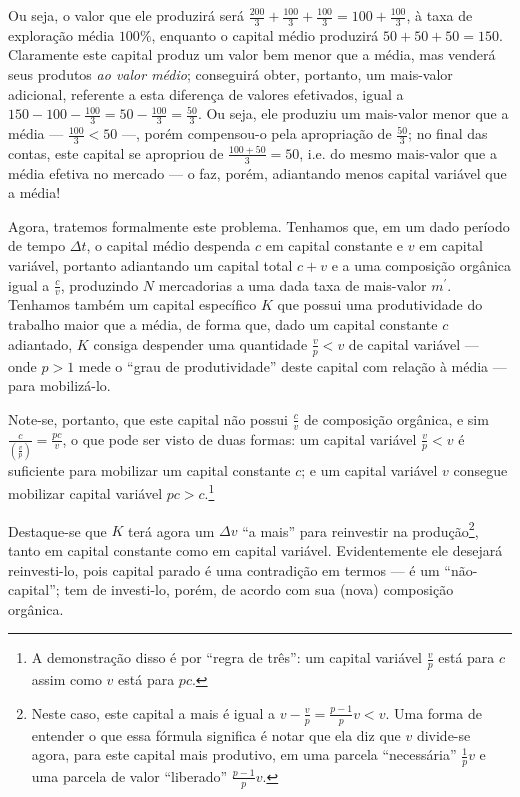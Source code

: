 Ou seja, o valor que ele produzirá será $\frac{200}{3} + \frac{100}{3} + \frac{100}{3}=100+\frac{100}{3}$, à taxa de exploração média $100\%$, enquanto o capital médio produzirá $50+50+50=150$. Claramente este capital produz um valor bem menor que a média, mas venderá seus produtos \textit{ao valor médio}; conseguirá obter, portanto, um mais-valor adicional, referente a esta diferença de valores efetivados, igual a $150-100 - \frac{100}{3}=50-\frac{100}{3}=\frac{50}{3}$. Ou seja, ele produziu um mais-valor menor que a média — $\frac{100}{3}<50$ —, porém compensou-o pela apropriação de $\frac{50}{3}$; no final das contas, este capital se apropriou de $\frac{100+50}{3} = 50$, i.e. do mesmo mais-valor que a média efetiva no mercado — o faz, porém, adiantando menos capital variável que a média!

Agora, tratemos formalmente este problema. Tenhamos que, em um dado período de tempo $\Delta t$, o capital médio despenda $c$ em capital constante e $v$ em capital variável, portanto adiantando um capital total $c+v$ e a uma composição orgânica igual a $\frac{c}{v}$, produzindo $N$ mercadorias a uma dada taxa de mais-valor $m^{\prime}$. Tenhamos também um capital específico $K$ que possui uma produtividade do trabalho maior que a média, de forma que, dado um capital constante $c$ adiantado, $K$ consiga despender uma quantidade $\frac{v}{p}<v$ de capital variável — onde $p>1$ mede o ``grau de produtividade'' deste capital com relação à média — para mobilizá-lo.

Note-se, portanto, que este capital não possui $\frac{c}{v}$ de composição orgânica, e sim $\frac{c}{\left( \frac{v}{p} \right)} = \frac{pc}{v}$, o que pode ser visto de duas formas: um capital variável $\frac{v}{p}<v$ é suficiente para mobilizar um capital constante $c$; e um capital variável $v$ consegue mobilizar capital variável $pc>c$.\footnote{A demonstração disso é por ``regra de três'': um capital variável $\frac{v}{p}$ está para $c$ assim como $v$ está para $pc$.}

Destaque-se que $K$ terá agora um $\Delta v$ ``a mais'' para reinvestir na produção\footnote{Neste caso, este capital a mais é igual a $v-\frac{v}{p} = \frac{p-1}{p}v < v$. Uma forma de entender o que essa fórmula significa é notar que ela diz que $v$ divide-se agora, para este capital mais produtivo, em uma parcela ``necessária'' $\frac{1}{p}v$ e uma parcela de valor ``liberado'' $\frac{p-1}{p}v$. }, tanto em capital constante como em capital variável. Evidentemente ele desejará reinvesti-lo, pois capital parado é uma contradição em termos — é um ``não-capital''; tem de investi-lo, porém, de acordo com sua (nova) composição orgânica. 

